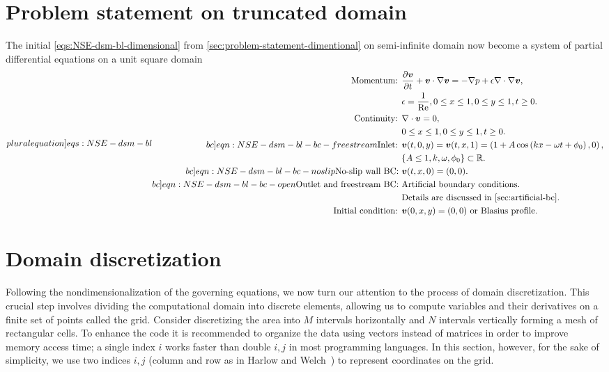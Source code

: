 \documentclass{article}
\numberwithin{equation}{section}
\begin{document}
\pagebreak
\section{Problem statement on truncated domain}\label{sec:problem-statement-nondimensional}
The initial \cref{eqs:NSE-dsm-bl-dimensional} from \cref{sec:problem-statement-dimentional} on semi-infinite domain now become a system of partial differential equations on a unit square domain 
\begin{subequations}
\label[pluralequation]{eqs:NSE-dsm-bl}
\begin{align}
\label{eqn:momentum}
\text{Momentum: }	&\frac{\partial \boldsymbol{v}}{\partial t} + \boldsymbol{v} \cdot \nabla \boldsymbol{v} = -\nabla p + \epsilon \nabla \cdot \nabla \boldsymbol{v}, \\ 
					&\epsilon = \frac{1}{\operatorname{Re}},0\leq x \leq 1, 0\leq y \leq 1, t\geq0.\notag\\
\label{eqn:continuity-dsm-bl}
\text{Continuity: }	& \nabla \cdot \boldsymbol{v} = 0, \\ 
					&0\leq x \leq 1, 0\leq y \leq 1, t\geq0. \notag\\
\label[bc]{eqn:NSE-dsm-bl-bc-freestream}
\text{Inlet: } 	& \boldsymbol{v}(t,0,y)=\boldsymbol{v}(t,x,1)=\left(1 + A\cos\left( kx -\omega t + \phi_0 \right),0\right),\\
									& \{A\leq 1,k,\omega, \phi_0\}\subset \mathbb{R}.\notag\\
\label[bc]{eqn:NSE-dsm-bl-bc-noslip}
\text{No-slip wall BC: } & \boldsymbol{v}(t,x,0)=(0,0). \\
\label[bc]{eqn:NSE-dsm-bl-bc-open}
\text{Outlet and freestream BC: } 	&\text{Artificial boundary conditions.} \notag\\
					&\text{Details are discussed in \cref{sec:artificial-bc}.}\notag\\
\text{Initial condition: } &\boldsymbol{v}(0,x,y)=(0,0)\text{ or Blasius profile}.
\end{align}
\end{subequations}

\section{Domain discretization}\label{sec:domain-discretization}
Following the nondimensionalization of the governing equations, we now turn our attention to the process of domain discretization. 
This crucial step involves dividing the computational domain into discrete elements, allowing us to compute variables and their derivatives on a finite set of points called the grid. 
Consider discretizing the area into $M$ intervals horizontally and $N$ intervals vertically forming a mesh of rectangular cells. 
To enhance the code it is recommended to organize the data using vectors instead of matrices in order to improve memory access time; a single index $i$ works faster than double $i,j$ in most programming languages. 
In this section, however, for the sake of simplicity, we use two indices $i,j$ (column and row as in Harlow and Welch~\cite{Harlow:1965}) to represent coordinates on the grid.
\end{document}
